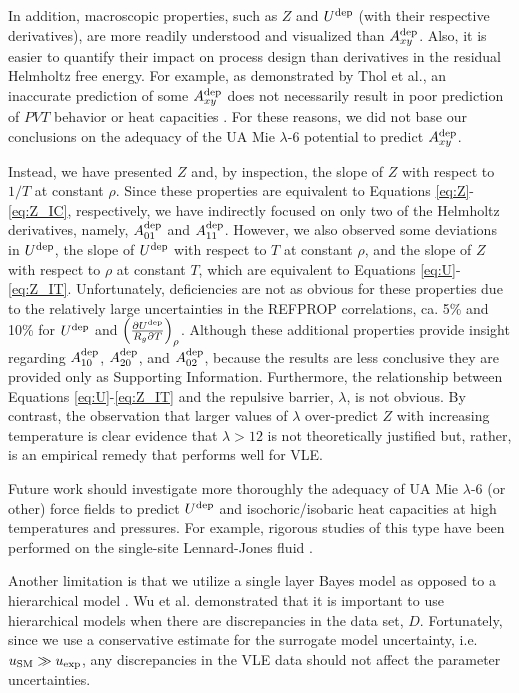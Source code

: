 \documentclass[journal=jctc,manuscript=article]{achemso}
\begin{document}
In addition, macroscopic properties, such as $Z$ and $U^{\rm dep}$ (with their respective derivatives), are more readily understood and visualized than $A_{xy}^{\rm dep}$. Also, it is easier to quantify their impact on process design than derivatives in the residual Helmholtz free energy. For example, as demonstrated by Thol et al., an inaccurate prediction of some $A_{xy}^{\rm dep}$ does not necessarily result in poor prediction of $PVT$ behavior or heat capacities \cite{Thol2016_siloxane_first}. For these reasons, we did not base our conclusions on the adequacy of the UA Mie $\lambda$-6 potential to predict $A_{xy}^{\rm dep}$.

Instead, we have presented $Z$ and, by inspection, the slope of $Z$ with respect to $1/T$ at constant $\rho$. Since these properties are equivalent to Equations \ref{eq:Z}-\ref{eq:Z_IC}, respectively, we have indirectly focused on only two of the Helmholtz derivatives, namely, $A_{01}^{\rm dep}$ and $A_{11}^{\rm dep}$. However, we also observed some deviations in $U^{\rm dep}$, the slope of $U^{\rm dep}$ with respect to $T$ at constant $\rho$, and the slope of $Z$ with respect to $\rho$ at constant $T$, which are equivalent to Equations \ref{eq:U}-\ref{eq:Z_IT}. Unfortunately, deficiencies are not as obvious for these properties due to the relatively large uncertainties in the REFPROP correlations, ca. 5\% and 10\% for $U^{\rm dep}$ and $\left(\frac{\partial U^{\rm dep}}{R_g \partial T}\right)_\rho$. Although these additional properties provide insight regarding $A_{10}^{\rm dep}$, $A_{20}^{\rm dep}$, and $A_{02}^{\rm dep}$, because the results are less conclusive they are provided only as Supporting Information. Furthermore, the relationship between Equations \ref{eq:U}-\ref{eq:Z_IT} and the repulsive barrier, $\lambda$, is not obvious. By contrast, the observation that larger values of $\lambda$ over-predict $Z$ with increasing temperature is clear evidence that $\lambda > 12$ is not theoretically justified but, rather, is an empirical remedy that performs well for VLE.

Future work should investigate more thoroughly the adequacy of UA Mie $\lambda$-6 (or other) force fields to predict $U^{\rm dep}$ and isochoric/isobaric heat capacities at high temperatures and pressures. For example, rigorous studies of this type have been performed on the single-site Lennard-Jones fluid \cite{Thol2016_LJ,Thol_LJTS,Rutkai2017}.  

Another limitation is that we utilize a single layer Bayes model as opposed to a hierarchical model \cite{Kulakova2017,Wu2016}. Wu et al. demonstrated that it is important to use hierarchical models when there are discrepancies in the data set, $D$. Fortunately, since we use a conservative estimate for the surrogate model uncertainty, i.e. $u_{\rm SM} \gg u_{\rm exp}$, any discrepancies in the VLE data should not affect the parameter uncertainties. 
\end{document}
